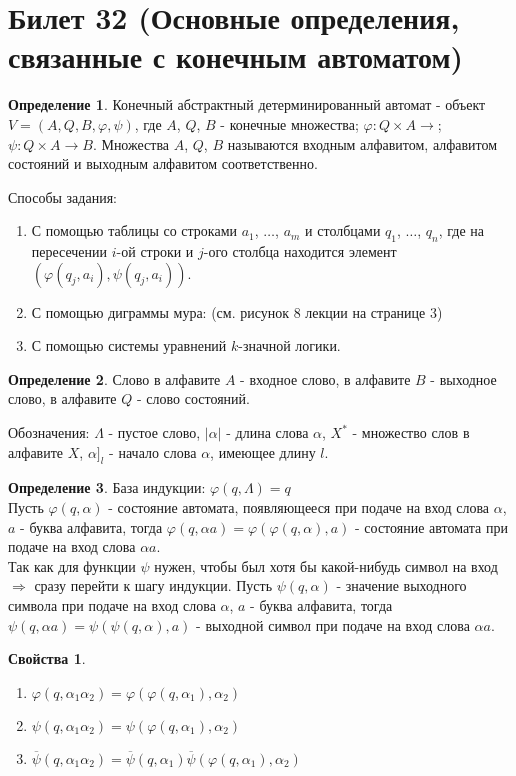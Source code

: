 \documentclass[a4paper, 12pt]{article}
\renewcommand{\phi}{\varphi}
\theoremstyle{definition}
\newtheorem*{definition}{Определение}
\theoremstyle{plain}
\newtheorem*{properties}{Свойства}
\theoremstyle{remark}
\begin{document}
  \section{Билет 32 (Основные определения, связанные с конечным автоматом)}
  \begin{definition}
    Конечный абстрактный детерминированный автомат - объект $V=(A,Q,B,\phi,\psi)$, где $A$, $Q$, $B$ - конечные множества; $\phi:Q\times A\rightarrow$; $\psi:Q\times A\rightarrow B$. Множества $A$, $Q$, $B$ называются входным алфавитом, алфавитом состояний и выходным алфавитом соответственно.
  \end{definition}
  Способы задания:\\
  \begin{enumerate}
    \item С помощью таблицы со строками $a_1$, $\ldots$, $a_m$ и столбцами $q_1$, $\ldots$, $q_n$, где на пересечении $i$-ой строки и $j$-ого столбца находится элемент $(\phi(q_j, a_i), \psi(q_j, a_i))$.
    \item С помощью диграммы мура: (см. рисунок 8 лекции на странице 3)
    \item С помощью системы уравнений $k$-значной логики.
  \end{enumerate}
  \begin{definition}
    Слово в алфавите $A$ - входное слово, в алфавите $B$ - выходное слово, в алфавите $Q$ - слово состояний.
  \end{definition}
  Обозначения: $\Lambda$ - пустое слово, $|\alpha|$ - длина слова $\alpha$, $X^*$ - множество слов в алфавите $X$, $\alpha]_l$ - начало слова $\alpha$, имеющее длину $l$.
  \begin{definition}
    База индукции: $\phi(q, \Lambda)=q$\\
    Пусть $\phi(q,\alpha)$ - состояние автомата, появляющееся при подаче на вход слова $\alpha$, $a$ - буква алфавита, тогда $\phi(q, \alpha a)=\phi(\phi(q,\alpha),a)$ - состояние автомата при подаче на вход слова $\alpha a$.\\
    Так как для функции $\psi$ нужен, чтобы был хотя бы какой-нибудь символ на вход $\Longrightarrow$ сразу перейти к шагу индукции.
    Пусть $\psi(q,\alpha)$ - значение выходного символа при подаче на вход слова $\alpha$, $a$ - буква алфавита, тогда $\psi(q,\alpha a)=\psi(\psi(q,\alpha),a)$ - выходной символ при подаче на вход слова $\alpha a$.
  \end{definition}
  \begin{properties}
    \begin{enumerate}
      \item $\phi(q,\alpha_1\alpha_2)=\phi(\phi(q,\alpha_1),\alpha_2)$
      \item $\psi(q,\alpha_1\alpha_2)=\psi(\phi(q,\alpha_1),\alpha_2)$
      \item $\overline{\psi}(q,\alpha_1\alpha_2)=\overline{\psi}(q,\alpha_1)\overline{\psi}(\phi(q,\alpha_1),\alpha_2)$
    \end{enumerate}
  \end{properties}
\end{document}
